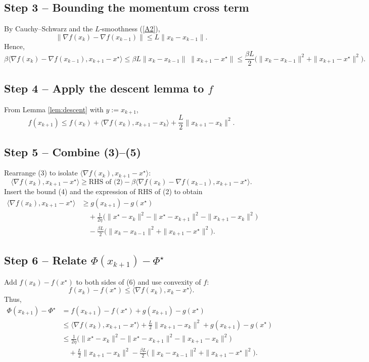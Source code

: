 \documentclass{article}
\begin{document}
\subsection*{Step 3 – Bounding the momentum cross term}
By Cauchy–Schwarz and the $L$‑smoothness (\ref{A2}),
\[
\|\nabla f(x_k)-\nabla f(x_{k-1})\|
\le L\|x_k-x_{k-1}\|.
\]
Hence,
\[
\beta\langle\nabla f(x_k)-\nabla f(x_{k-1}),x_{k+1}-x^{\star}\rangle
\le
\beta L\|x_k-x_{k-1}\|\;\|x_{k+1}-x^{\star}\|
\le
\frac{\beta L}{2}\bigl(\|x_k-x_{k-1}\|^{2}+\|x_{k+1}-x^{\star}\|^{2}\bigr). \tag{4}
\]

\subsection*{Step 4 – Apply the descent lemma to $f$}
From Lemma \ref{lem:descent} with $y:=x_{k+1}$,
\[
f(x_{k+1})\le f(x_k)+\langle\nabla f(x_k),x_{k+1}-x_k\rangle+\frac{L}{2}\|x_{k+1}-x_k\|^{2}. \tag{5}
\]

\subsection*{Step 5 – Combine (3)–(5)}
Rearrange (3) to isolate $\langle\nabla f(x_k),x_{k+1}-x^{\star}\rangle$:
\[
\langle\nabla f(x_k),x_{k+1}-x^{\star}\rangle
\ge
\text{RHS of (2)}-\beta\langle\nabla f(x_k)-\nabla f(x_{k-1}),x_{k+1}-x^{\star}\rangle.
\]
Insert the bound (4) and the expression of RHS of (2) to obtain
\begin{align}
\langle\nabla f(x_k),x_{k+1}-x^{\star}\rangle
&\ge
g(x_{k+1})-g(x^{\star}) \nonumber\\
&\quad+\frac{1}{2\eta}\bigl(\|x^{\star}-x_k\|^{2}
-\|x^{\star}-x_{k+1}\|^{2}
-\|x_{k+1}-x_k\|^{2}\bigr) \nonumber\\
&\quad-\frac{\beta L}{2}\bigl(\|x_k-x_{k-1}\|^{2}+\|x_{k+1}-x^{\star}\|^{2}\bigr). \tag{6}
\end{align}

\subsection*{Step 6 – Relate $\Phi(x_{k+1})-\Phi^{\star}$}
Add $f(x_k)-f(x^{\star})$ to both sides of (6) and use convexity of $f$:
\[
f(x_k)-f(x^{\star})\le\langle\nabla f(x_k),x_k-x^{\star}\rangle.
\]
Thus,
\begin{align}
\Phi(x_{k+1})-\Phi^{\star}
&=f(x_{k+1})-f(x^{\star})+g(x_{k+1})-g(x^{\star}) \nonumber\\
&\le \langle\nabla f(x_k),x_{k+1}-x^{\star}\rangle
+\frac{L}{2}\|x_{k+1}-x_k\|^{2}+g(x_{k+1})-g(x^{\star}) \nonumber\\
&\le \frac{1}{2\eta}\bigl(\|x^{\star}-x_k\|^{2}
-\|x^{\star}-x_{k+1}\|^{2}
-\|x_{k+1}-x_k\|^{2}\bigr) \nonumber\\
&\quad+\frac{L}{2}\|x_{k+1}-x_k\|^{2}
-\frac{\beta L}{2}\bigl(\|x_k-x_{k-1}\|^{2}+\|x_{k+1}-x^{\star}\|^{2}\bigr). \tag{7}
\end{align}
\end{document}
